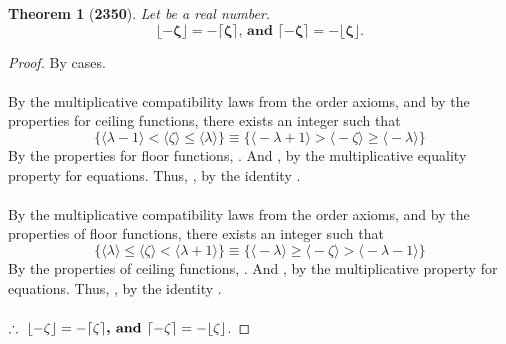 \documentclass[preview]{standalone}
\newtheorem{theorem}{Theorem}
\begin{document}
\begin{theorem}[\textbf{2350}]
    Let \bm{$\zeta$} be a real number. 
    \begin{equation*}
        \bm{
            \lfloor - \zeta \rfloor 
                = 
            - \lceil \zeta \rceil
                \textbf{, and }
            \lceil - \zeta \rceil
                = 
            - \lfloor \zeta \rfloor
        }.
    \end{equation*}
\end{theorem}


\begin{proof}
    By cases.
    \\ \\
     By the multiplicative compatibility laws from the order axioms,
    and by the properties for ceiling functions,
    there exists an integer \bm{$\lceil \zeta \rceil = \lambda$} such that
    \begin{equation*}
        \Bigg\{
            \Big \langle \lambda - 1 \Big \rangle
                <
            \Big \langle \zeta \Big \rangle
                \leq
            \Big \langle \lambda \Big \rangle
        \Bigg\}
            \equiv
        \Bigg\{
            \Big \langle - \lambda + 1 \Big \rangle 
                > 
            \Big \langle - \zeta \Big \rangle
                \ge 
            \Big \langle - \lambda \Big \rangle
        \Bigg\}
    \end{equation*}
    By the properties for floor functions, 
    \bm{$\lfloor - \zeta \rfloor = - \lambda$}.
    And \bm{$-1 \times \lceil \zeta \rceil = - \lambda$}, 
    by the multiplicative equality property for equations.
    Thus, \bm{$\lfloor - \zeta \rfloor = - \lceil \zeta \rceil$}, 
    by the identity \bm{$- \lambda$}.
    \\ \\
     By the multiplicative compatibility laws from the order axioms,
    and by the properties of floor functions,
    there exists an integer \bm{$\lfloor \zeta \rfloor = \lambda$} such that
    \begin{equation*}
        \Bigg\{
            \Big \langle \lambda \Big \rangle
                \le 
            \Big \langle \zeta \Big \rangle
                < 
            \Big \langle \lambda + 1 \Big \rangle
        \Bigg\}
            \equiv
        \Bigg\{
            \Big \langle - \lambda \Big \rangle
                \ge 
            \Big \langle - \zeta \Big \rangle
                > 
            \Big \langle - \lambda - 1 \Big \rangle
        \Bigg\}
    \end{equation*}
    By the properties of ceiling functions,
    \bm{$\lceil - \zeta \rceil = - \lambda$}. 
    And  
    \bm{$- 1 \times \lfloor \zeta \rfloor = - \lambda$}, 
    by the multiplicative property for equations.
    Thus,
    \bm{$\lceil - \zeta \rceil = - \lfloor \zeta \rfloor$},
    by the identity \bm{$- \lambda$}.
    \\ \\
    $\therefore \text{\space}
    \relax{
            \lfloor - \zeta \rfloor 
                = 
            - \lceil \zeta \rceil
                \textbf{, and }
            \lceil - \zeta \rceil
                = 
            - \lfloor \zeta \rfloor
    }$.
\end{proof}
\end{document}
